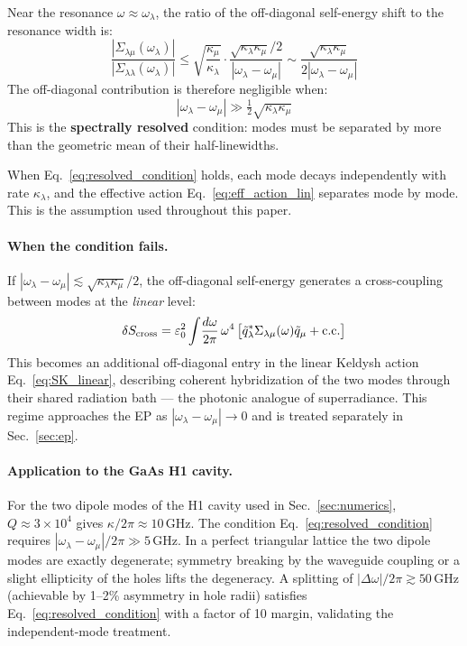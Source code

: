 \documentclass[12pt]{article}
\begin{document}
Near the resonance $\omega\approx\omega_\lambda$, the ratio of the
off-diagonal self-energy shift to the resonance width is:
\begin{equation}
  \frac{|\Sigma_{\lambda\mu}(\omega_\lambda)|}
  {|\Sigma_{\lambda\lambda}(\omega_\lambda)|}
  \leq \sqrt{\frac{\kappa_\mu}{\kappa_\lambda}}\cdot
  \frac{\sqrt{\kappa_\lambda\kappa_\mu}/2}
  {|\omega_\lambda-\omega_\mu|}
  \sim \frac{\sqrt{\kappa_\lambda\kappa_\mu}}
  {2|\omega_\lambda-\omega_\mu|}
  \label{eq:offdiag_ratio}
\end{equation}
The off-diagonal contribution is therefore negligible when:
\begin{equation}
  \boxed{|\omega_\lambda-\omega_\mu|\gg\tfrac{1}{2}
  \sqrt{\kappa_\lambda\kappa_\mu}}
  \label{eq:resolved_condition}
\end{equation}
This is the \textbf{spectrally resolved} condition: modes must be separated
by more than the geometric mean of their half-linewidths.

When Eq.~\eqref{eq:resolved_condition} holds, each mode decays
independently with rate $\kappa_\lambda$, and the effective action
Eq.~\eqref{eq:eff_action_lin} separates mode by mode.  This is the
assumption used throughout this paper.

\paragraph{When the condition fails.}
If $|\omega_\lambda-\omega_\mu|\lesssim\sqrt{\kappa_\lambda\kappa_\mu}/2$,
the off-diagonal self-energy generates a cross-coupling between modes
at the \emph{linear} level:
\begin{equation}
  \delta S_{\rm cross} = \varepsilon_0^2\int\!\frac{d\omega}{2\pi}\,
  \omega^4\,\bigl[\tilde{q}_\lambda^*\Sigma_{\lambda\mu}(\omega)
  \tilde{q}_\mu + \mathrm{c.c.}\bigr]
  \label{eq:cross_coupling}
\end{equation}
This becomes an additional off-diagonal entry in the linear Keldysh
action Eq.~\eqref{eq:SK_linear}, describing coherent hybridization
of the two modes through their shared radiation bath --- the
photonic analogue of superradiance.  This regime approaches the EP
as $|\omega_\lambda-\omega_\mu|\to 0$ and is treated separately in
Sec.~\ref{sec:ep}.

\paragraph{Application to the GaAs H1 cavity.}
For the two dipole modes of the H1 cavity used in Sec.~\ref{sec:numerics},
$Q\approx 3\times10^4$ gives $\kappa/2\pi\approx 10\,\mathrm{GHz}$.
The condition Eq.~\eqref{eq:resolved_condition} requires
$|\omega_\lambda-\omega_\mu|/2\pi\gg 5\,\mathrm{GHz}$.
In a perfect triangular lattice the two dipole modes are exactly
degenerate; symmetry breaking by the waveguide coupling or a slight
ellipticity of the holes lifts the degeneracy.  A splitting of
$|\Delta\omega|/2\pi\gtrsim 50\,\mathrm{GHz}$ (achievable by 1--2\%
asymmetry in hole radii) satisfies Eq.~\eqref{eq:resolved_condition}
with a factor of 10 margin, validating the independent-mode treatment.
\end{document}
